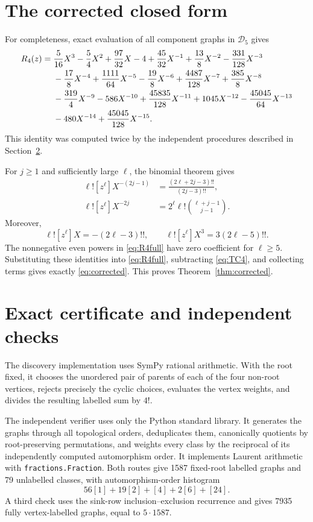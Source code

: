 \documentclass[11pt]{amsart}
\theoremstyle{definition}
\newcommand{\D}{\mathcal D}
\begin{document}
\section{The corrected closed form}

For completeness, exact evaluation of all component graphs in $\D_5$ gives
\begin{align}\label{eq:R4full}
R_4(z)={}&\frac5{16}X^3-\frac54X^2+\frac{97}{32}X-4
+\frac{45}{32}X^{-1}+\frac{13}{8}X^{-2}-\frac{331}{128}X^{-3}\notag\\
&-\frac{17}{8}X^{-4}+\frac{1111}{64}X^{-5}-\frac{19}{8}X^{-6}
+\frac{4487}{128}X^{-7}+\frac{385}{8}X^{-8}\notag\\
&-\frac{319}{4}X^{-9}-586X^{-10}+\frac{45835}{128}X^{-11}
+1045X^{-12}-\frac{45045}{64}X^{-13}\notag\\
&-480X^{-14}+\frac{45045}{128}X^{-15}.
\end{align}
This identity was computed twice by the independent procedures described in
Section~\ref{sec:certificate}.

For $j\ge1$ and sufficiently large $\ell$, the binomial theorem gives
\begin{align*}
\ell![z^\ell]X^{-(2j-1)}
 &=\frac{(2\ell+2j-3)!!}{(2j-3)!!},\\
\ell![z^\ell]X^{-2j}
 &=2^\ell\ell!\binom{\ell+j-1}{j-1}.
\end{align*}
Moreover,
\[
\ell![z^\ell]X=-(2\ell-3)!!,
\qquad
\ell![z^\ell]X^3=3(2\ell-5)!!.
\]
The nonnegative even powers in \eqref{eq:R4full} have zero coefficient for
$\ell\ge5$.  Substituting these identities into \eqref{eq:R4full}, subtracting
\eqref{eq:TC4}, and collecting terms gives exactly \eqref{eq:corrected}.
This proves Theorem~\ref{thm:corrected}.

\section{Exact certificate and independent checks}\label{sec:certificate}

The discovery implementation uses SymPy rational arithmetic.  With the root
fixed, it chooses the unordered pair of parents of each of the four non-root
vertices, rejects precisely the cyclic choices, evaluates the vertex weights,
and divides the resulting labelled sum by $4!$.

The independent verifier uses only the Python standard library.  It generates
the graphs through all topological orders, deduplicates them, canonically
quotients by root-preserving permutations, and weights every class by the
reciprocal of its independently computed automorphism order.  It implements
Laurent arithmetic with \texttt{fractions.Fraction}.  Both routes give 1587
fixed-root labelled graphs and 79 unlabelled classes, with automorphism-order
histogram
\[
56[1]+19[2]+[4]+2[6]+[24].
\]
A third check uses the sink-row inclusion--exclusion recurrence and gives 7935
fully vertex-labelled graphs, equal to $5\cdot1587$.
\end{document}
